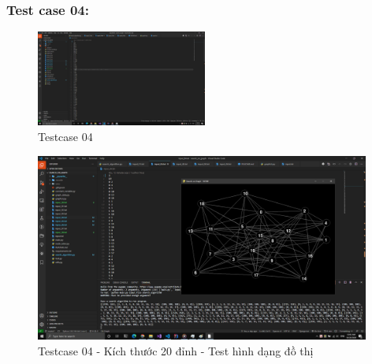 \documentclass{article}
\begin{document}
\subsubsection{Test case 04:}
\begin{figure}[H]
\centering
\includegraphics[width=0.5\textwidth]{Test_Case_04.png}
\caption{Testcase 04}
\end{figure}
\begin{figure}[H]
\centering
\includegraphics[width=0.98\textwidth]{Test_Case_04_Content.png}
\caption{Testcase 04 - Kích thước 20 đỉnh - Test hình dạng đồ thị}
\end{figure}
\end{document}
